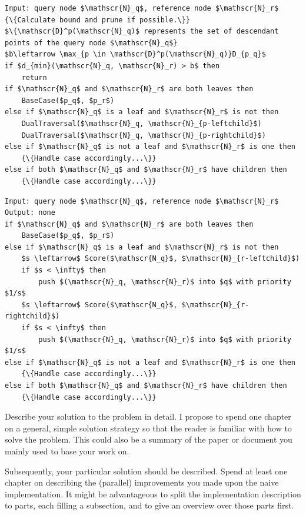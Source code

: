\documentclass{utue} %
\begin{document}
\begin{lstlisting}[caption={\texttt{DualTraversal}($\mathscr{N}_q,\mathscr{N}_r$)}]
Input: query node $\mathscr{N}_q$, reference node $\mathscr{N}_r$
{\{Calculate bound and prune if possible.\}}
$\{\mathscr{D}^p(\mathscr{N}_q)$ represents the set of descendant points of the query node $\mathscr{N}_q$}
$b\leftarrow \max_{p \in \mathscr{D}^p(\mathscr{N}_q)}D_{p_q}$
if $d_{min}(\mathscr{N}_q, \mathscr{N}_r) > b$ then
	return
if $\mathscr{N}_q$ and $\mathscr{N}_r$ are both leaves then
	BaseCase($p_q$, $p_r$)
else if $\mathscr{N}_q$ is a leaf and $\mathscr{N}_r$ is not then
	DualTraversal($\mathscr{N}_q, \mathscr{N}_{p-leftchild}$)
	DualTraversal($\mathscr{N}_q, \mathscr{N}_{p-rightchild}$)
else if $\mathscr{N}_q$ is not a leaf and $\mathscr{N}_r$ is one then
	{\{Handle case accordingly...\}}
else if both $\mathscr{N}_q$ and $\mathscr{N}_r$ have children then
	{\{Handle case accordingly...\}}
\end{lstlisting}

\begin{lstlisting}[caption={\texttt{ImprovedDualTraversal}($\mathscr{N}_q,\mathscr{N}_r$)}]
Input: query node $\mathscr{N}_q$, reference node $\mathscr{N}_r$
Output: none
if $\mathscr{N}_q$ and $\mathscr{N}_r$ are both leaves then
	BaseCase($p_q$, $p_r$)
else if $\mathscr{N}_q$ is a leaf and $\mathscr{N}_r$ is not then
	$s \leftarrow$ Score($\mathscr{N_q}$, $\mathscr{N}_{r-leftchild}$)
	if $s < \infty$ then
		push $(\mathscr{N}_q, \mathscr{N}_r)$ into $q$ with priority $1/s$
	$s \leftarrow$ Score($\mathscr{N_q}$, $\mathscr{N}_{r-rightchild}$)
	if $s < \infty$ then
		push $(\mathscr{N}_q, \mathscr{N}_r)$ into $q$ with priority $1/s$
else if $\mathscr{N}_q$ is not a leaf and $\mathscr{N}_r$ is one then
	{\{Handle case accordingly...\}}
else if both $\mathscr{N}_q$ and $\mathscr{N}_r$ have children then
	{\{Handle case accordingly...\}}
\end{lstlisting}

Describe your solution to the problem in detail. I propose to spend one chapter on a general, simple solution strategy so that the reader is familiar with how to solve the problem. This could also be a summary of the paper or document you mainly used to base your work on.

Subsequently, your particular solution should be described. Spend at least one chapter on describing the (parallel) improvements you made upon the naive implementation. It might be advantageous to split the implementation description to parts, each filling a subsection, and to give an overview over those parts first.
\end{document}
